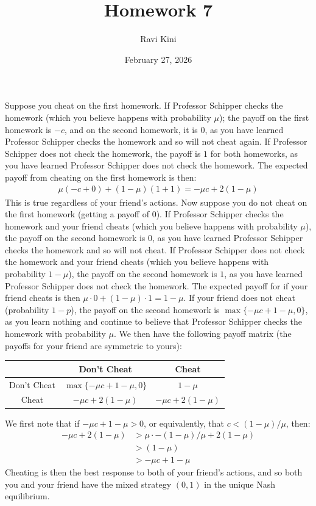\documentclass{article}
\title{Homework 7}
\author{Ravi Kini}
\date{February 27, 2026}
\begin{document}
\maketitle

\problem{}
Suppose you cheat on the first homework. If Professor Schipper checks the homework (which you believe happens with probability $\mu$); the payoff on the first homework is $-c$, and on the second homework, it is $0$, as you have learned Professor Schipper checks the homework and so will not cheat again. If Professor Schipper does not check the homework, the payoff is $1$ for both homeworks, as you have learned Professor Schipper does not check the homework. The expected payoff from cheating on the first homework is then:
\begin{align*}
    \mu(-c + 0) + (1 - \mu)(1 + 1) = -\mu c + 2(1 - \mu)
\end{align*}
This is true regardless of your friend's actions. Now suppose you do not cheat on the first homework (getting a payoff of $0$). If Professor Schipper checks the homework and your friend cheats (which you believe happens with probability $\mu$), the payoff on the second homework is $0$, as you have learned Professor Schipper checks the homework and so will not cheat. If Professor Schipper does not check the homework and your friend cheats (which you believe happens with probability $1 - \mu$), the payoff on the second homework is $1$, as you have learned Professor Schipper does not check the homework. The expected payoff for if your friend cheats is then $\mu \cdot 0 + (1 - \mu) \cdot 1 = 1 - \mu$. If your friend does not cheat (probability $1 - p$), the payoff on the second homework is $\max\{-\mu c + 1 - \mu, 0\}$, as you learn nothing and continue to believe that Professor Schipper checks the homework with probability $\mu$. We then have the following payoff matrix (the payoffs for your friend are symmetric to yours):
\begin{center}
\begin{tabular}{|c|c|c|}
    \hline
     & Don't Cheat & Cheat \\
     \hline
     Don't Cheat & $\max\{-\mu c + 1 - \mu, 0\}$ & $1 - \mu$ \\
     \hline
     Cheat & $-\mu c + 2(1 - \mu)$ & $-\mu c + 2(1 - \mu)$ \\
     \hline
\end{tabular}
\end{center}

We first note that if $-\mu c + 1 - \mu > 0$, or equivalently, that $c < (1 - \mu)/\mu$, then:
\begin{align*}
    -\mu c + 2(1 - \mu) & > \mu \cdot -(1 - \mu)/\mu + 2(1 - \mu) \\
    & > (1 - \mu) \\
    & > -\mu c + 1 - \mu
\end{align*}
Cheating is then the best response to both of your friend's actions, and so both you and your friend have the mixed strategy $(0, 1)$ in the unique Nash equilibrium.
\end{document}
